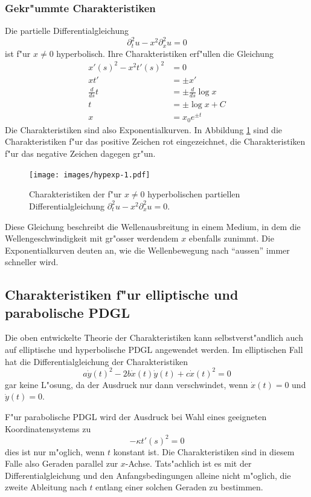 \subsubsection{Gekr"ummte Charakteristiken}
Die partielle Differentialgleichung
\[
\partial_t^2u-x^2\partial_x^2u=0
\]
ist f"ur $x\ne 0$ hyperbolisch.
Ihre Charakteristiken erf"ullen die Gleichung
\begin{align*}
x'(s)^2-x^2t'(s)^2&=0
\\
xt'&=\pm  x'
\\
\frac{d}{ds}t&=\pm\frac{d}{ds}\log x
\\
t&=\pm\log x+C
\\
x&=x_0e^{\pm t}
\end{align*}
Die Charakteristiken sind also Exponentialkurven. In Abbildung \ref{hyp:exp}
sind die Charakteristiken f"ur das positive Zeichen rot eingezeichnet, die
Charakteristiken f"ur das negative Zeichen dagegen gr"un.
\begin{figure}
\begin{center}
\texttt{[image: images/hypexp-1.pdf]}
\end{center}
\caption{Charakteristiken der f"ur $x\ne 0$ hyperbolischen
partiellen Differentialgleichung
$\partial_t^2u-x^2\partial_x^2u=0$.
\label{hyp:exp}}
\end{figure}

Diese Gleichung beschreibt die Wellenausbreitung in einem Medium,
in dem die Wellengeschwindigkeit mit gr"osser werdendem $x$ ebenfalls
zunimmt. Die Exponentialkurven deuten an, wie die Wellenbewegung nach ``aussen''
immer schneller wird.

\subsection{Charakteristiken f"ur elliptische und parabolische PDGL}
Die oben entwickelte Theorie der Charakteristiken kann selbstverst"andlich
auch auf elliptische und hyperbolische PDGL angewendet werden.
Im elliptischen Fall hat die Differentialgleichung der Charakteristiken
\[
a\dot y(t)^2-2b\dot x(t)\dot y(t)+c\dot x(t)^2=0
\]
gar keine L"osung, da der Ausdruck nur dann verschwindet, wenn $\dot x(t)=0$
und $\dot y(t)=0$.

F"ur parabolische PDGL wird der Ausdruck bei Wahl eines geeigneten
Koordinatensystems zu
\[
-\kappa t'(s)^2=0
\]
dies ist nur m"oglich, wenn $t$ konstant ist. Die Charakteristiken
sind in diesem Falle also Geraden parallel zur $x$-Achse.
Tats"achlich ist es mit der Differentialgleichung und
den Anfangsbedingungen alleine nicht
m"oglich, die zweite Ableitung nach $t$ entlang einer solchen Geraden
zu bestimmen.

